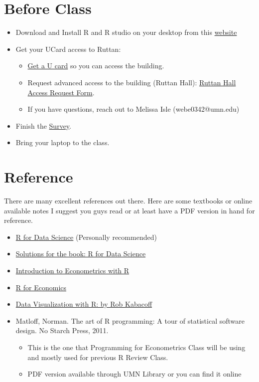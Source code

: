 \documentclass{article}
\begin{document}
\section*{Before Class}
\begin{itemize}
    \item Download and Install R and R studio on your desktop from this \href{https://posit.co/download/rstudio-desktop/}{website} 
    \item Get your UCard access to Ruttan:
    \begin{itemize}
        \item \href{https://ucard.tc.umn.edu/your-u-card/getting-your-first-u-card}{Get a U card} so you can access the building. 
        \item Request advanced access to the building (Ruttan Hall): \href{https://docs.google.com/forms/d/e/1FAIpQLScTSUXcENXbf5PBaqZPNW_kaDG2gEaVljUVd8saW4M4IFY3DQ/viewform}{Ruttan Hall Access Request Form}. 
        \item If you have questions, reach out to Melissa Isle (webe0342@umn.edu)
    \end{itemize}
    \item Finish the \href{https://forms.gle/rqeCeCi6PYFNpSbw6}{Survey}.
    \item Bring your laptop to the class. 

\end{itemize}


\section*{Reference}
There are many excellent references out there. Here are some textbooks or online available notes I suggest you guys read or at least have a PDF version in hand for reference. 

\begin{itemize}
    \item \href{https://r4ds.had.co.nz/index.html}{R for Data Science} (Personally recommended)
    \item \href{https://jrnold.github.io/r4ds-exercise-solutions/}{Solutions for the book: R for Data Science}
    \item \href{https://www.econometrics-with-r.org/index.html}{Introduction to Econometrics with R}
    \item \href{https://libguides.bates.edu/r/r-for-economics}{R for Economics}
    \item \href{https://rkabacoff.github.io/datavis/datavis.pdf}{Data Visualization with R: by Rob Kabacoff}
    \item Matloff, Norman. The art of R programming: A tour of statistical software design. No Starch Press, 2011. 
    \begin{itemize}
        \item This is the one that Programming for Econometrics Class will be using and mostly used for previous R Review Class.
        \item PDF version available through UMN Library or you can find it online
    \end{itemize}
\end{itemize}
\end{document}
